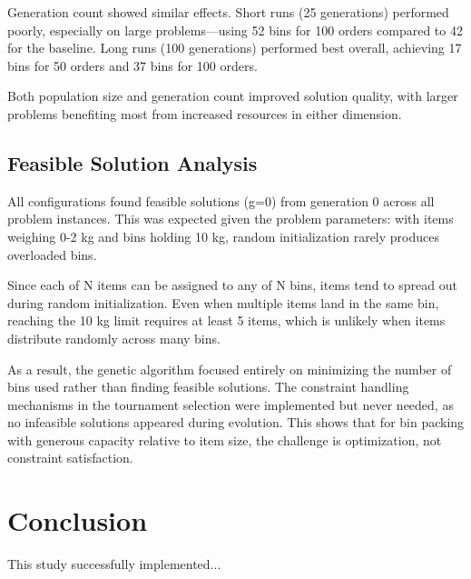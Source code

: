 \documentclass[journal,12pt,onecolumn]{IEEEtran}
\begin{document}
Generation count showed similar effects. Short runs (25 generations) performed poorly, especially on large problems—using 52 bins for 100 orders compared to 42 for the baseline. Long runs (100 generations) performed best overall, achieving 17 bins for 50 orders and 37 bins for 100 orders.

Both population size and generation count improved solution quality, with larger problems benefiting most from increased resources in either dimension.

\subsection{Feasible Solution Analysis}

All configurations found feasible solutions (g=0) from generation 0 across all problem instances. This was expected given the problem parameters: with items weighing 0-2 kg and bins holding 10 kg, random initialization rarely produces overloaded bins.

Since each of N items can be assigned to any of N bins, items tend to spread out during random initialization. Even when multiple items land in the same bin, reaching the 10 kg limit requires at least 5 items, which is unlikely when items distribute randomly across many bins.

As a result, the genetic algorithm focused entirely on minimizing the number of bins used rather than finding feasible solutions. The constraint handling mechanisms in the tournament selection were implemented but never needed, as no infeasible solutions appeared during evolution. This shows that for bin packing with generous capacity relative to item size, the challenge is optimization, not constraint satisfaction.

\section{Conclusion}
This study successfully implemented...
\end{document}
